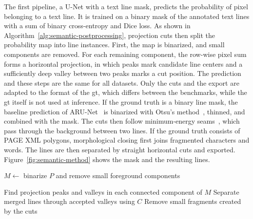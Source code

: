 \label{sec:semantic-postprocessing}The first pipeline, a U-Net with a text line mask, predicts the probability of pixel belonging to a text line. It is trained on a binary mask of the annotated text lines with a sum of binary cross-entropy and Dice loss. As shown in Algorithm~\ref{alg:semantic-postprocessing}, projection cuts then split the probability map into line instances. First, the map is binarized, and small components are removed. For each remaining component, the row-wise pixel sum forms a horizontal projection, in which peaks mark candidate line centers and a sufficiently deep valley between two peaks marks a cut position. The prediction and these steps are the same for all datasets. Only the cuts and the export are adapted to the format of the \gls{gt}, which differs between the benchmarks, while the \gls{gt} itself is not used at inference. If the ground truth is a binary line mask, the baseline prediction of ARU-Net~\cite{gruning2019arunet} is binarized with Otsu's method~\cite{otsu1979threshold}, thinned, and combined with the mask. The cuts then follow minimum-energy seams~\cite{avidan2007seamcarving, saabni2014textline}, which pass through the background between two lines. If the ground truth consists of PAGE XML polygons, morphological closing first joins fragmented characters and words. The lines are then separated by straight horizontal cuts and exported. Figure~\ref{fig:semantic-method} shows the mask and the resulting lines.

\begin{algorithm}[htbp]
    \small
    \caption{Postprocessing of a semantic text line probability map}
    \label{alg:semantic-postprocessing}

    \(M \leftarrow\) binarize \(P\) and remove small foreground components\;


    Find projection peaks and valleys in each connected component of \(M\)\;
    Separate merged lines through accepted valleys using \(C\)\;
    Remove small fragments created by the cuts\;

\end{algorithm}


